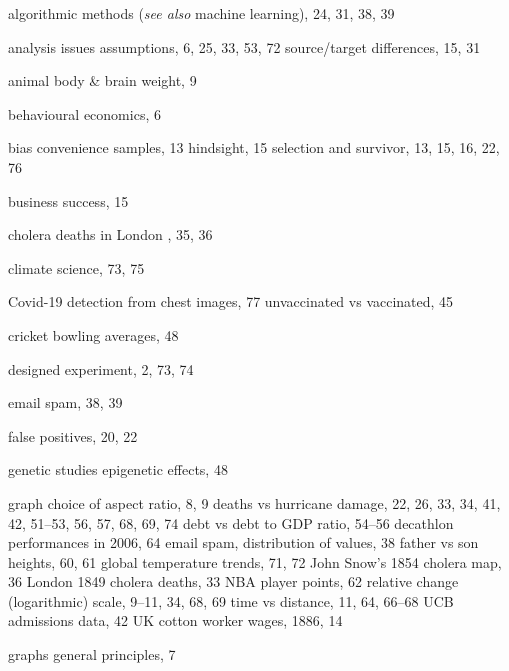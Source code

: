 \documentclass[
  10ptls,
  b5paper]{book}
\begin{document}
\begin{theindex}

  \item algorithmic methods (\textit{see also} machine learning), 24, 
        31, 38, 39
  \item analysis issues
    \subitem assumptions, 6, 25, 33, 53, 72
    \subitem source/target differences, 15, 31
  \item animal body \& brain weight, 9

  \indexspace

  \item behavioural economics, 6
  \item bias
    \subitem convenience samples, 13
    \subitem hindsight, 15
    \subitem selection and survivor, 13, 15, 16, 22, 76
  \item business success, 15

  \indexspace

  \item cholera deaths in London
    , 35, 36
  \item climate science, 73, 75
  \item Covid-19
    \subitem detection from chest images, 77
    \subitem unvaccinated vs vaccinated, 45
  \item cricket bowling averages, 48

  \indexspace

  \item designed experiment, 2, 73, 74

  \indexspace

  \item email spam, 38, 39

  \indexspace

  \item false positives, 20, 22

  \indexspace

  \item genetic studies
    \subitem epigenetic effects, 48
  \item graph
    \subitem choice of aspect ratio, 8, 9
    \subitem deaths vs hurricane damage, 22, 26, 33, 34, 41, 42, 51--53, 
        56, 57, 68, 69, 74
    \subitem debt vs debt to GDP ratio, 54--56
    \subitem decathlon performances in 2006, 64
    \subitem email spam, distribution of values, 38
    \subitem father vs son heights, 60, 61
    \subitem global temperature trends, 71, 72
    \subitem John Snow's 1854 cholera map, 36
    \subitem London 1849 cholera deaths, 33
    \subitem NBA player points, 62
    \subitem relative change (logarithmic) scale, 9--11, 34, 68, 69
    \subitem time vs distance, 11, 64, 66--68
    \subitem UCB admissions data, 42
    \subitem UK cotton worker wages, 1886, 14
  \item graphs
    \subitem general principles, 7


\end{theindex}
\end{document}
